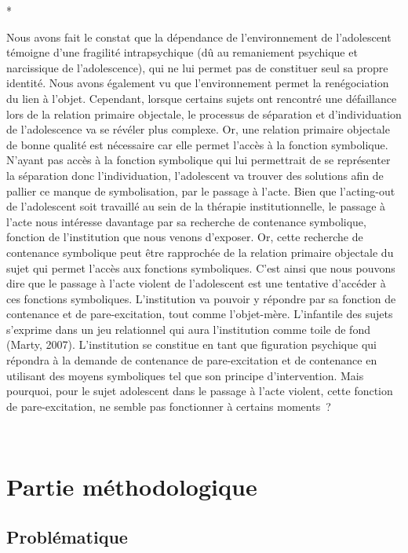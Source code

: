 \documentclass[12pt, a4paper]{book}
\begin{document}
\begin{spacing}{1.5}
\vspace{1cm}
\centerline{*}
\vspace{1cm}

Nous avons fait le constat que la dépendance de l'environnement de l'adolescent témoigne d'une fragilité intrapsychique (dû au remaniement psychique et narcissique de l'adolescence), qui ne lui permet pas de constituer seul sa propre identité. Nous avons également vu que l'environnement permet la renégociation du lien à l'objet. Cependant, lorsque certains sujets ont rencontré une défaillance lors de la relation primaire objectale, le processus de séparation et d'individuation de l'adolescence va se révéler plus complexe. Or, une relation primaire objectale de bonne qualité est nécessaire car elle permet l'accès à la fonction symbolique. N'ayant pas accès à la fonction symbolique qui lui permettrait de se représenter la séparation donc l'individuation, l'adolescent va trouver des solutions afin de pallier ce manque de symbolisation, par le passage à l'acte. Bien que l'acting-out de l'adolescent soit travaillé au sein de la thérapie institutionnelle, le passage à l'acte nous intéresse davantage par sa recherche de contenance symbolique, fonction de l'institution que nous venons d'exposer. Or, cette recherche de contenance symbolique peut être rapprochée de la relation primaire objectale du sujet qui permet l'accès aux fonctions symboliques. C'est ainsi que nous pouvons dire que le passage à l'acte violent de l'adolescent est une tentative d'accéder à ces fonctions symboliques. L'institution va pouvoir y répondre par sa fonction de contenance et de pare-excitation, tout comme l'objet-mère. L'infantile des sujets s'exprime dans un jeu relationnel qui aura l'institution comme toile de fond (Marty, 2007). L'institution se constitue en tant que figuration psychique qui répondra à la demande de contenance de pare-excitation et de contenance en utilisant des moyens symboliques tel que son principe d'intervention. Mais pourquoi, pour le sujet adolescent dans le passage à l'acte violent, cette fonction de pare-excitation, ne semble pas fonctionner à certains moments ?


﻿\part{Partie méthodologique}

\chapter{Problématique}


\end{spacing}
\end{document}
